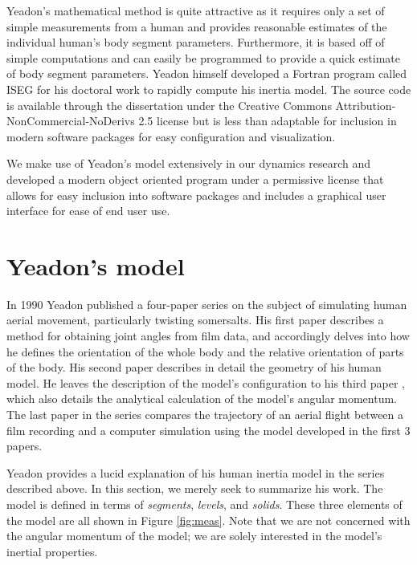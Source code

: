\documentclass[10pt]{article}
\begin{document}


Yeadon's mathematical method is quite attractive as it requires only a set of
simple measurements from a human and provides reasonable estimates of the
individual human's body segment parameters. Furthermore, it is based off of
simple computations and can easily be programmed to provide a quick estimate of
body segment parameters. Yeadon himself developed a Fortran program called ISEG
for his doctoral work \cite{Yeadon1984a} to rapidly compute his inertia model.
The source code is available through the dissertation under the Creative
Commons Attribution-NonCommercial-NoDerivs 2.5 license but is less than
adaptable for inclusion in modern software packages for easy configuration and
visualization.

We make use of Yeadon's model extensively in our dynamics research and
developed a modern object oriented program under a permissive license that
allows for easy inclusion into software packages and includes a graphical user
interface for ease of end user use.

\section*{Yeadon's model}

In 1990 Yeadon published a four-paper series on the subject of simulating
human aerial movement, particularly twisting somersalts. His first paper
\cite{Yeadon1990c} describes a method for obtaining joint angles from film
data, and accordingly delves into how he defines the orientation of the whole
body and the relative orientation of parts of the body. His second paper
\cite{Yeadon1990f} describes in detail the geometry of his human model. He
leaves the description of the model's configuration to his third paper
\cite{Yeadon1990e}, which also details the analytical calculation of the
model's angular momentum. The last paper in the series \cite{Yeadon1990d}
compares the trajectory of an aerial flight between a film recording and a
computer simulation using the model developed in the first 3 papers.

Yeadon provides a lucid explanation of his human inertia model in the series
described above. In this section, we merely seek to summarize his work. The
model is defined in terms of \emph{segments}, \emph{levels}, and \emph{solids}.
These three elements of the model are all shown in Figure \ref{fig:meas}. Note
that we are not concerned with the angular momentum of the model; we are solely
interested in the model's inertial properties.
\end{document}
